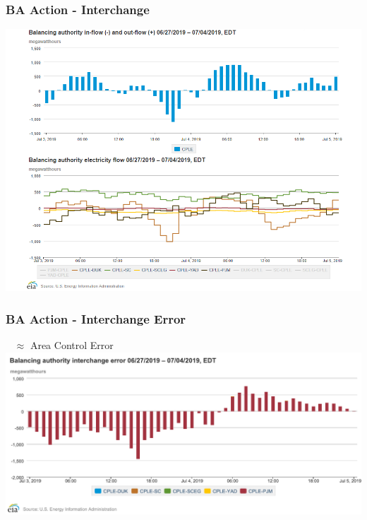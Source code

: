 \documentclass[14pt, unknownkeysallowed]{beamer}
\begin{document}
\begin{frame}
\frametitle{BA Action - Interchange} %
\begin{center}
\includegraphics[height=.82\textheight]{BAinterchange} {\tiny \cite{BAinformation} }%
\end{center}

\end{frame}
\begin{frame}
\frametitle{BA Action - Interchange Error} \ \vspace{.5em}
$\approx$ Area Control Error
{\centering
{\includegraphics[height=.6\textheight]{chart4}} {\tiny \cite{BAinformation} }%
}

\end{frame}
\end{document}
